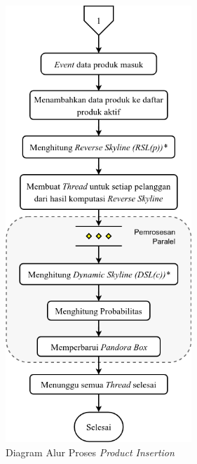 \begin{figure}[H]
	\centering
	\includegraphics[width=7cm]{assets/img/bab3/flowchart-pi.png}
	\caption{Diagram Alur Proses \textit{Product Insertion}}
	\label{fig:flowchart-pi}
\end{figure}


